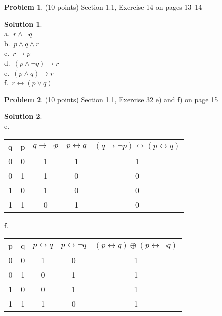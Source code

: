 \documentclass{article}
\theoremstyle{definition}
\newtheorem{problem}{Problem}
\newtheorem*{solution}{Solution}
\begin{document}
\begin{problem} (10 points) Section 1.1, Exercise 14 on pages 13--14
\end{problem}
\begin{solution}~\\
a.\ $r \land \neg q$ \\
b.\ $p \land q \land r$ \\
c.\ $r \to p$ \\
d.\ $(p \land \neg q) \to r$ \\ 
e.\ $(p \land q) \to r$ \\
f.\ $r \leftrightarrow (p  \lor q)$ \\
\end{solution} 

\begin{problem} (10 points) Section 1.1, Exercise 32 e) and f) on page 15
\end{problem}
\begin{solution}~\\
e.\ \\
\begin {tabular} {| c | c | c | c | c |}
    q & p & $q \to \neg p$ & $p \leftrightarrow q$ & $(q \to \neg p) \leftrightarrow (p \leftrightarrow q)$\\
	0 & 0 &       1        &        1              &                      1\\
	0 & 1 &       1        &        0              &                      0\\
	1 & 0 &       1        &        0              &                      0\\
	1 & 1 &       0        &        1              &                      0\\
\end{tabular}
f.\ \\
\begin {tabular} {| c | c | c | c | c |}
    p & q & $p \leftrightarrow q$ & $p \leftrightarrow \neg q$ & $(p \leftrightarrow q) \oplus (p \leftrightarrow \neg q)$\\
	0 & 0 &       1               &          0                 &                   1\\
	0 & 1 &       0               &          1                 &                   1\\
	1 & 0 &       0               &          1                 &                   1\\
	1 & 1 &       1               &          0                 &                   1\\
\end{tabular}
\end{solution}
\end{document}
